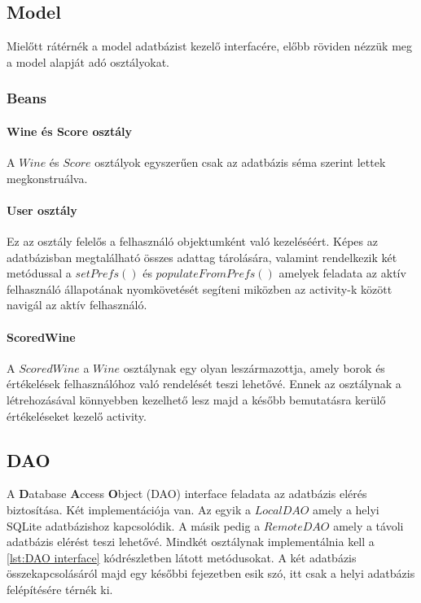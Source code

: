 \documentclass[12pt]{report}
\theoremstyle{definition}
\begin{document}
	\subsection{Model}
	
	Mielőtt rátérnék a model adatbázist kezelő interfacére, előbb röviden nézzük meg a model alapját adó osztályokat.
	
	\subsubsection{Beans}
	\paragraph{Wine és Score osztály}
	A $Wine$ és $Score$ osztályok egyszerűen csak az adatbázis séma szerint lettek megkonstruálva.
	
	\paragraph{User osztály}
	Ez az osztály felelős a felhasználó objektumként való kezeléséért. Képes az adatbázisban megtalálható összes adattag tárolására, valamint rendelkezik két metódussal a $setPrefs\left(\right)$ és $populateFromPrefs\left(\right)$ amelyek feladata az aktív felhasználó állapotának nyomkövetését segíteni miközben az activity-k között navigál az aktív felhasználó.
	
	\paragraph{ScoredWine}
	A $ScoredWine$ a $Wine$ osztálynak egy olyan leszármazottja, amely borok és értékelések felhasználóhoz való rendelését teszi lehetővé. Ennek az osztálynak a létrehozásával könnyebben kezelhető lesz majd a később bemutatásra kerülő értékeléseket kezelő activity.
	
	\subsection{DAO}
	A \textbf{D}atabase \textbf{A}ccess \textbf{O}bject (DAO) interface feladata az adatbázis elérés biztosítása. Két implementációja van. Az egyik a $LocalDAO$ amely a helyi SQLite adatbázishoz kapcsolódik. A másik pedig a $RemoteDAO$ amely a távoli adatbázis elérést teszi lehetővé. Mindkét osztálynak implementálnia kell a \ref{lst:DAO interface} kódrészletben látott metódusokat. A két adatbázis összekapcsolásáról majd egy későbbi fejezetben esik szó, itt csak a helyi adatbázis felépítésére térnék ki.
	
\end{document}
